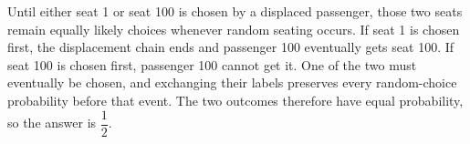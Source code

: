 Until either seat 1 or seat 100 is chosen by a displaced passenger, those two seats remain equally likely choices whenever random seating occurs. If seat 1 is chosen first, the displacement chain ends and passenger 100 eventually gets seat 100. If seat 100 is chosen first, passenger 100 cannot get it. One of the two must eventually be chosen, and exchanging their labels preserves every random-choice probability before that event. The two outcomes therefore have equal probability, so the answer is $\boxed{\dfrac{1}{2}}$.
